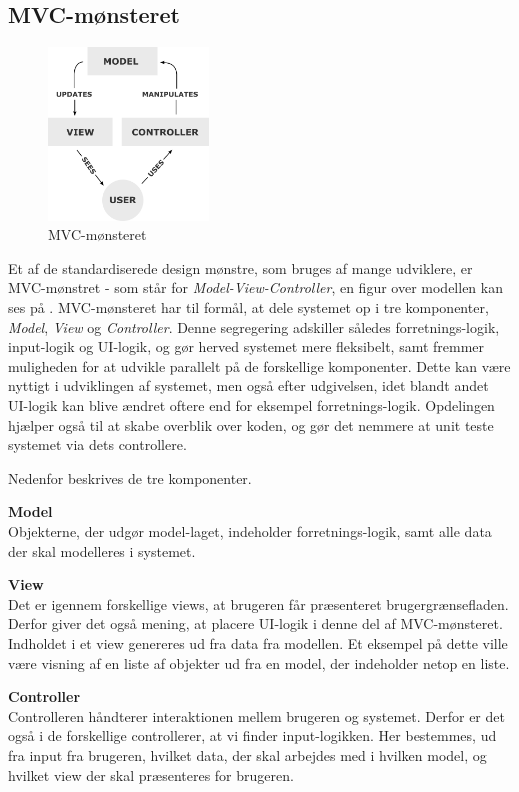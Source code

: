 \subsection{MVC-mønsteret}\label{MVC}
\begin{figure}
	\vspace{0pt}
	\begin{center}
		\includegraphics[width=0.38\textwidth]{images/Images/mvc.png}
	\end{center}
	\vspace{-20pt}
	\caption{MVC-mønsteret \citep{mvcpic}}\label{MVC-Figure}
	\vspace{-10pt}
\end{figure}
Et af de standardiserede design mønstre, som bruges af mange udviklere, er MVC-mønstret - som står for \textit{Model-View-Controller}, en figur over modellen kan ses på .
MVC-mønsteret har til formål, at dele systemet op i tre komponenter, \textit{Model}, \textit{View} og \textit{Controller}.
Denne segregering adskiller således forretnings-logik, input-logik og UI-logik, og gør herved systemet mere fleksibelt, samt fremmer muligheden for at udvikle parallelt på de forskellige komponenter.
Dette kan være nyttigt i udviklingen af systemet, men også efter udgivelsen, idet blandt andet UI-logik kan blive ændret oftere end for eksempel forretnings-logik.
Opdelingen hjælper også til at skabe overblik over koden, og gør det nemmere at unit teste systemet via dets controllere. \citep{MVC_Overview}

Nedenfor beskrives de tre komponenter.

\textbf{Model}\\
Objekterne, der udgør model-laget, indeholder forretnings-logik, samt alle data der skal modelleres i systemet.

\textbf{View}\\
Det er igennem forskellige views, at brugeren får præsenteret brugergrænsefladen. 
Derfor giver det også mening, at placere UI-logik i denne del af MVC-mønsteret.
Indholdet i et view genereres ud fra data fra modellen.
Et eksempel på dette ville være visning af en liste af objekter ud fra en model, der indeholder netop en liste.

\textbf{Controller}\\
Controlleren håndterer interaktionen mellem brugeren og systemet.
Derfor er det også i de forskellige controllerer, at vi finder input-logikken. 
Her bestemmes, ud fra input fra brugeren, hvilket data, der skal arbejdes med i hvilken model, og hvilket view der skal præsenteres for brugeren.

